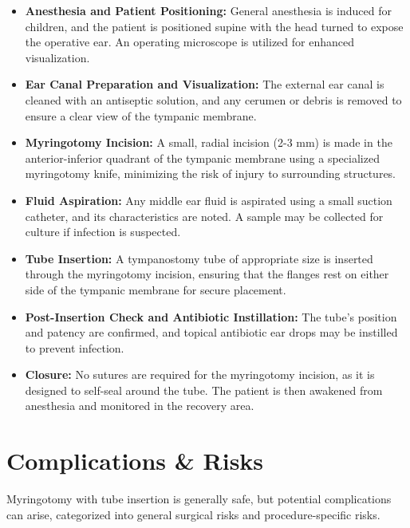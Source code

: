 \begin{itemize}
  \item \textbf{Anesthesia and Patient Positioning:} General anesthesia is induced for children, and the patient is positioned supine with the head turned to expose the operative ear. An operating microscope is utilized for enhanced visualization.
  
  \item \textbf{Ear Canal Preparation and Visualization:} The external ear canal is cleaned with an antiseptic solution, and any cerumen or debris is removed to ensure a clear view of the tympanic membrane.
  
  \item \textbf{Myringotomy Incision:} A small, radial incision (2-3 mm) is made in the anterior-inferior quadrant of the tympanic membrane using a specialized myringotomy knife, minimizing the risk of injury to surrounding structures.
  
  \item \textbf{Fluid Aspiration:} Any middle ear fluid is aspirated using a small suction catheter, and its characteristics are noted. A sample may be collected for culture if infection is suspected.
  
  \item \textbf{Tube Insertion:} A tympanostomy tube of appropriate size is inserted through the myringotomy incision, ensuring that the flanges rest on either side of the tympanic membrane for secure placement.
  
  \item \textbf{Post-Insertion Check and Antibiotic Instillation:} The tube's position and patency are confirmed, and topical antibiotic ear drops may be instilled to prevent infection.
  
  \item \textbf{Closure:} No sutures are required for the myringotomy incision, as it is designed to self-seal around the tube. The patient is then awakened from anesthesia and monitored in the recovery area.
\end{itemize}

\section*{Complications \& Risks}
Myringotomy with tube insertion is generally safe, but potential complications can arise, categorized into general surgical risks and procedure-specific risks.

